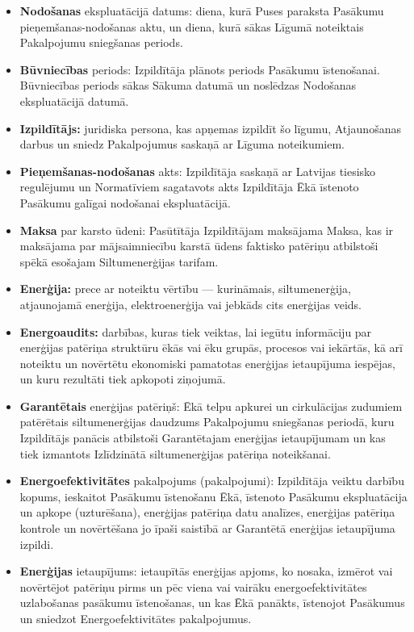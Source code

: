\begin{multicols}{2}
\begin{itemize}[label={}]
	\item\textbf{Nodošanas} ekspluatācijā datums: diena, kurā Puses paraksta Pasākumu pieņemšanas-nodošanas aktu, un diena, kurā sākas Līgumā noteiktais Pakalpojumu sniegšanas periods.
	\item\textbf{Būvniecības} periods:  Izpildītāja plānots periods Pasākumu īstenošanai. Būvniecības periods sākas Sākuma datumā un noslēdzas Nodošanas ekspluatācijā datumā.
	\item\textbf{Izpildītājs:} juridiska persona, kas apņemas izpildīt šo līgumu, Atjaunošanas darbus un sniedz Pakalpojumus saskaņā ar Līguma noteikumiem.
	\item\textbf{Pieņemšanas-nodošanas} akts: Izpildītāja saskaņā ar Latvijas tiesisko regulējumu un Normatīviem sagatavots akts Izpildītāja Ēkā īstenoto Pasākumu galīgai nodošanai ekspluatācijā.
	\item\textbf{Maksa} par karsto ūdeni: Pasūtītāja Izpildītājam maksājama Maksa, kas ir maksājama par mājsaimniecību karstā ūdens faktisko patēriņu atbilstoši spēkā esošajam Siltumenerģijas tarifam.
	\item\textbf{Enerģija:} prece ar noteiktu vērtību — kurināmais, siltumenerģija, atjaunojamā enerģija, elektroenerģija vai jebkāds cits enerģijas veids.
	\item\textbf{Energoaudits:} darbības, kuras tiek veiktas, lai iegūtu informāciju par enerģijas patēriņa struktūru ēkās vai ēku grupās, procesos vai iekārtās, kā arī noteiktu un novērtētu ekonomiski pamatotas enerģijas ietaupījuma iespējas, un kuru rezultāti tiek apkopoti ziņojumā.
	\item\textbf{Garantētais} enerģijas patēriņš: Ēkā telpu apkurei un cirkulācijas zudumiem patērētais siltumenerģijas daudzums Pakalpojumu sniegšanas periodā, kuru Izpildītājs panācis atbilstoši Garantētajam enerģijas ietaupījumam un kas tiek izmantots Izlīdzinātā siltumenerģijas patēriņa noteikšanai.
	\item\textbf{Energoefektivitātes} pakalpojums (pakalpojumi): Izpildītāja veiktu darbību kopums, ieskaitot Pasākumu īstenošanu Ēkā, īstenoto Pasākumu ekspluatācija un apkope (uzturēšana), enerģijas patēriņa datu analīzes, enerģijas patēriņa kontrole un novērtēšana jo īpaši saistībā ar Garantētā enerģijas ietaupījuma izpildi.
	\item\textbf{Enerģijas} ietaupījums: ietaupītās enerģijas apjoms, ko nosaka, izmērot vai novērtējot patēriņu pirms un pēc viena vai vairāku energoefektivitātes uzlabošanas pasākumu īstenošanas, un kas Ēkā panākts, īstenojot Pasākumus un sniedzot Energoefektivitātes pakalpojumus.

\end{itemize}
\end{multicols}
